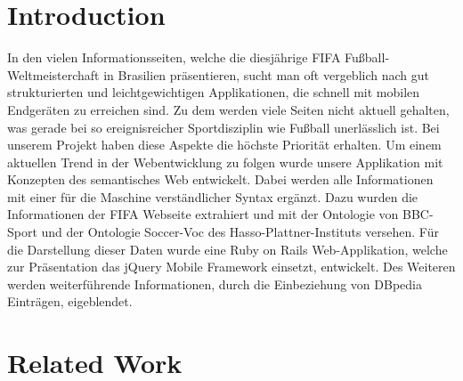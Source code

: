 \documentclass[runningheads,a4paper]{llncs}
\begin{document}
\section{Introduction}

In den vielen Informationsseiten, welche die diesjährige FIFA Fußball-Weltmeisterchaft in Brasilien präsentieren, sucht man oft vergeblich nach gut strukturierten und leichtgewichtigen Applikationen, die schnell mit mobilen Endgeräten zu erreichen sind. Zu dem werden viele Seiten nicht aktuell gehalten, was gerade bei so ereignisreicher Sportdisziplin wie Fußball unerlässlich ist. Bei unserem Projekt haben diese Aspekte die höchste Priorität erhalten. Um einem aktuellen Trend in der Webentwicklung zu folgen wurde unsere Applikation mit Konzepten des semantisches Web entwickelt. Dabei werden alle Informationen mit einer für die Maschine verständlicher Syntax ergänzt. Dazu wurden die Informationen der FIFA Webseite extrahiert und mit der Ontologie von BBC-Sport und der Ontologie Soccer-Voc des Hasso-Plattner-Instituts versehen. Für die Darstellung dieser Daten wurde eine Ruby on Rails Web-Applikation, welche zur Präsentation das jQuery Mobile Framework einsetzt, entwickelt. Des Weiteren werden weiterführende Informationen, durch die Einbeziehung von DBpedia Einträgen, eigeblendet.    


\section{Related Work}
\end{document}
